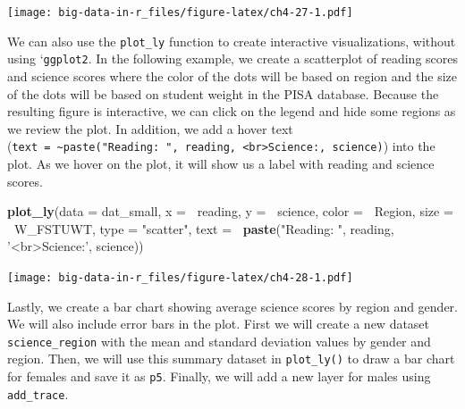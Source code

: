 \documentclass[]{book}
\newenvironment{Shaded}{\begin{snugshade}}{\end{snugshade}}
\newcommand{\DataTypeTok}[1]{\textcolor[rgb]{0.13,0.29,0.53}{#1}}
\newcommand{\KeywordTok}[1]{\textcolor[rgb]{0.13,0.29,0.53}{\textbf{#1}}}
\newcommand{\NormalTok}[1]{#1}
\newcommand{\OperatorTok}[1]{\textcolor[rgb]{0.81,0.36,0.00}{\textbf{#1}}}
\newcommand{\StringTok}[1]{\textcolor[rgb]{0.31,0.60,0.02}{#1}}
\begin{document}
\texttt{[image: big-data-in-r\_files/figure-latex/ch4-27-1.pdf]}

We can also use the \texttt{plot\_ly} function to create interactive visualizations, without using `\texttt{ggplot2}. In the following example, we create a scatterplot of reading scores and science scores where the color of the dots will be based on region and the size of the dots will be based on student weight in the PISA database. Because the resulting figure is interactive, we can click on the legend and hide some regions as we review the plot. In addition, we add a hover text (\texttt{text\ =\ \textasciitilde{}paste("Reading:\ ",\ reading,\ \textquotesingle{}\textless{}br\textgreater{}Science:\textquotesingle{},\ science)}) into the plot. As we hover on the plot, it will show us a label with reading and science scores.

\begin{Shaded}
\begin{Highlighting}[]
\KeywordTok{plot_ly}\NormalTok{(}\DataTypeTok{data =}\NormalTok{ dat_small,}
        \DataTypeTok{x =} \OperatorTok{~}\NormalTok{reading, }\DataTypeTok{y =} \OperatorTok{~}\NormalTok{science, }\DataTypeTok{color =} \OperatorTok{~}\NormalTok{Region,}
        \DataTypeTok{size =} \OperatorTok{~}\NormalTok{W_FSTUWT,}
        \DataTypeTok{type =} \StringTok{"scatter"}\NormalTok{,}
        \DataTypeTok{text =} \OperatorTok{~}\KeywordTok{paste}\NormalTok{(}\StringTok{"Reading: "}\NormalTok{, reading, }\StringTok{'<br>Science:'}\NormalTok{, science))}
\end{Highlighting}
\end{Shaded}

\texttt{[image: big-data-in-r\_files/figure-latex/ch4-28-1.pdf]}

Lastly, we create a bar chart showing average science scores by region and gender. We will also include error bars in the plot. First we will create a new dataset \texttt{science\_region} with the mean and standard deviation values by gender and region. Then, we will use this summary dataset in \texttt{plot\_ly()} to draw a bar chart for females and save it as \texttt{p5}. Finally, we will add a new layer for males using \texttt{add\_trace}.
\end{document}
